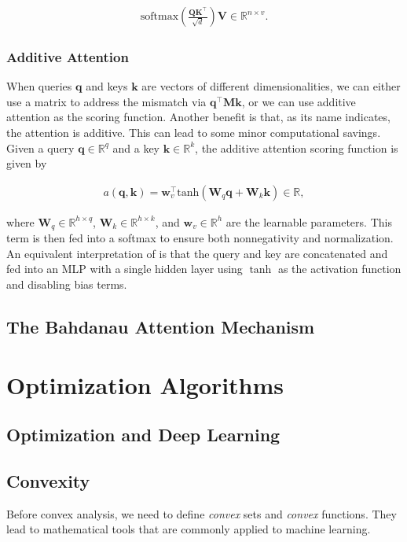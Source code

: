 \documentclass[a4paper,12pt]{article}
\theoremstyle{definition}
\begin{document}
\begin{align*}
    \mathrm{softmax}\left(\frac{\mathbf Q \mathbf K^\top }{\sqrt{d}}\right) \mathbf V \in \mathbb{R}^{n\times v}.
\end{align*}

\subsubsection*{Additive Attention}
When queries $\mathbf{q}$ and keys $\mathbf{k}$ are vectors of different dimensionalities, we can either use a matrix to address the mismatch via $\mathbf{q}^\top \mathbf{M} \mathbf{k}$,
or we can use additive attention as the scoring function. Another benefit is that, as its name indicates, the attention is additive. This can lead to some minor computational savings.
Given a query $\mathbf{q} \in \mathbb{R}^q$ and a key $\mathbf{k} \in \mathbb{R}^k$, the additive attention scoring function is given by

\begin{align*}
    a(\mathbf q, \mathbf k) = \mathbf w_v^\top \text{tanh}(\mathbf W_q\mathbf q + \mathbf W_k \mathbf k) \in \mathbb{R},
\end{align*}

where $\mathbf W_q\in\mathbb R^{h\times q}$, $\mathbf W_k\in\mathbb R^{h\times k}$, and $\mathbf w_v\in\mathbb R^{h}$ are the learnable parameters.
This term is then fed into a softmax to ensure both nonnegativity and normalization. An equivalent interpretation of is that the query and key are
concatenated and fed into an MLP with a single hidden layer using $\tanh$ as the activation function and disabling bias terms.

\subsection*{The Bahdanau Attention Mechanism}


\section{Optimization Algorithms}

\subsection{Optimization and Deep Learning}

\subsection{Convexity}
Before convex analysis, we need to define \emph{convex} sets and \emph{convex} functions. They lead to mathematical tools that are commonly applied to machine learning.
\end{document}

